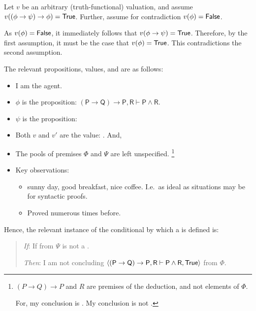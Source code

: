 \begin{note}
{    Let \(v\) be an arbitrary (truth-functional) valuation, and assume \(v((\phi \rightarrow \psi) \rightarrow \phi) = \text{\textsf{True}}\).
    Further, assume for contradiction \(v(\phi) = \text{\textsf{False}}\).

    As \(v(\phi) = \text{\textsf{False}}\), it immediately follows that \(v(\phi \rightarrow \psi) = \text{\textsf{True}}\).
    Therefore, by the first assumption, it must be the case that \(v(\phi) = \text{\textsf{True}}\).
    This contradictions the second assumption.
  }

  The relevant propositions, values, and  are as follows:
  \begin{itemize}[noitemsep]
  \item
    I am the agent.
  \item
    \(\phi\) is the proposition: \(\mathsf{(P \rightarrow Q) \rightarrow P, R \vdash P \land R}\).
  \item
    \(\psi\) is the proposition: 
  \item
    Both \(v\) and \(v'\) are the value: .
    And,
  \item
    The pools of premises \(\Phi\) and \(\Psi\) are left unspecified.%
    \footnote{
      \((P \rightarrow Q) \rightarrow P\) and \(R\) are premises of the deduction, and not elements of \(\Phi\).

      For, my conclusion is .
      My conclusion is not .
    }
  \item
    Key observations:
    \begin{itemize}[noitemsep]
    \item
      sunny day, good breakfast, nice coffee.
      I.e.\ as ideal as situations may be for syntactic proofs.
    \item
      Proved \sqE{} numerous times before.
    \end{itemize}
  \end{itemize}

  Hence, the relevant instance of the conditional by which a \requ{} is defined is:

  \begin{quote}
    \begin{itenum}
    \item[\emph{If}:]
      If  from \(\Psi\) is not a \fc{}.
    \item[\emph{Then}:]
      I am not concluding \(\langle \mathsf{(P \rightarrow Q) \rightarrow P, R \vdash P \land R}, \text{\textsf{True}} \rangle\) from \(\Phi\).
    \end{itenum}
  \end{quote}


\end{note}
